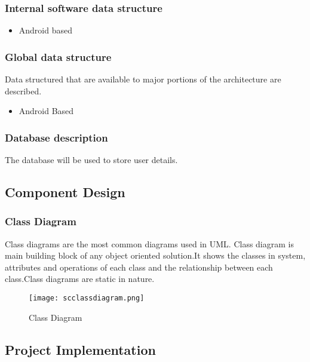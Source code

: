 \documentclass[10pt,a4paper]
{article}
\numberwithin{table}{section}
\begin{document}
{{\begin{normalsize}
\subsubsection{Internal software data structure}
\begin{itemize}
\item Android based
\end{itemize}
\subsubsection{Global data structure}
\hspace*{0.3cm}Data structured that are available to major portions of the architecture are described.
\begin{itemize}
\item Android Based
\end{itemize}

\subsubsection{Database description}

\hspace*{0.3cm}The database will be used to store user details.

\subsection{Component Design} 
\subsubsection{Class Diagram}
\hspace*{0.3cm} Class diagrams are the most common diagrams used in UML. Class diagram is main building block of any object oriented solution.It shows the classes in system, attributes and operations of each class and the relationship between each class.Class diagrams are static in nature.

\begin{center}
	  \begin{figure}[h]
			\centering
\texttt{[image: scclassdiagram.png]}
			\caption{Class Diagram}
		\end{figure}
	\end{center}

\subsection{Project Implementation}

\end{normalsize}}}
\end{document}
